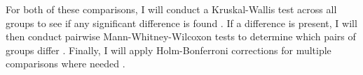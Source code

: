 For both of these comparisons, I will conduct a Kruskal-Wallis test across all groups to see if any significant difference is found \citep{kruskal_use_1952}. 
If a difference is present, I will then conduct pairwise Mann-Whitney-Wilcoxon tests to determine which pairs of groups differ \citep{10.2307/3001968}.
Finally, I will apply Holm-Bonferroni corrections for multiple comparisons where needed \citep{holmSimpleSequentiallyRejective1979}.



